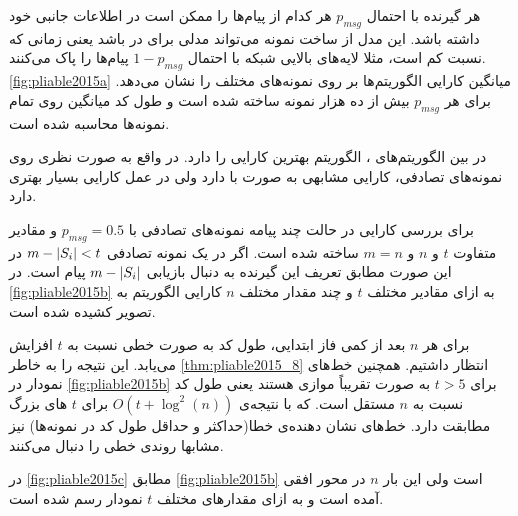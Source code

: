 هر گیرنده با احتمال
$p_{msg}$
هر کدام از پیام‌ها را ممکن است در اطلاعات جانبی خود داشته باشد. این مدل از ساخت نمونه می‌تواند مدلی برای
در
باشد یعنی زمانی که نسبت
کم است، مثلا لایه‌های بالایی شبکه با احتمال
$1 - p_{msg}$
پیام‌ها را پاک می‌کنند.
\autoref{fig:pliable2015a}
میانگین کارایی الگوریتم‌ها بر روی نمونه‌های مختلف را نشان می‌دهد. برای هر
$p_{msg}$
بیش از ده هزار نمونه ساخته شده است و طول کد میانگین روی تمام نمونه‌ها محاسبه شده است.

در بین الگوریتم‌های
\picod، الگوریتم
بهترین کارایی را دارد. در واقع
به صورت نظری روی نمونه‌های تصادفی، کارایی مشابهی به صورت
با
دارد ولی در عمل کارایی بسیار بهتری دارد.

برای بررسی کارایی
در حالت چند پیامه
نمونه‌های تصادفی با
$p_{msg} = 0.5$
و مقادیر متفاوت
$t$
و
$n$
و
$m = n$
ساخته شده است. اگر در یک نمونه‌ تصادفی
$m - \left|{S_i}\right| < t$
در این صورت مطابق تعریف این گیرنده به دنبال بازیابی
$m - \left|{S_i}\right|$
پیام است. در
\autoref{fig:pliable2015b}
به ازای مقادیر مختلف
$t$
و چند مقدار مختلف
$n$
کارایی الگوریتم به تصویر کشیده شده است.

برای هر
$n$
بعد از کمی فاز ابتدایی، طول کد به صورت خطی نسبت به
$t$
افزایش می‌یابد. این نتیجه را به خاطر
\autoref{thm:pliable2015_8}
انتظار داشتیم. همچنین خط‌های نمودار در
\autoref{fig:pliable2015b}
برای
$t > 5$
به صورت تقریباً موازی هستند یعنی طول کد نسبت به
$n$
مستقل است. که با نتیجه‌ی
$O(t + \log^2(n))$
برای
$t$
های بزرگ مطابقت دارد. خط‌های نشان دهنده‌ی خطا(حداکثر و حداقل طول کد در نمونه‌ها) نیز مشابها روندی خطی را دنبال می‌کنند.

در
\autoref{fig:pliable2015c}
مطابق
\autoref{fig:pliable2015b}
است ولی این بار
$n$
در محور افقی آمده است و به ازای مقدارهای مختلف
$t$
نمودار رسم شده است.

